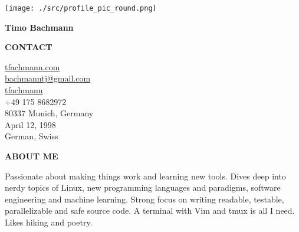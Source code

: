 \documentclass[a4paper, 10pt]{article}
\begin{document}
\thispagestyle{empty}

\begin{tcbraster}[raster columns=7]
\begin{tcolorbox}[left=4pt, right=4pt, top=4pt, height=1.0\textheight, colback=sidebar, boxrule=0.5pt, arc=8pt, frame empty, raster multicolumn=2, nobeforeafter]
    \texttt{[image: ./src/profile\_pic\_round.png]}
    \begin{center}
        {\large \textbf{Timo Bachmann}} \\
    \end{center}

    \vspace{6mm}
    \begin{center}
        {\textbf{CONTACT}} \\
    \end{center}
    \small
    \begin{spacing}{1.325}
        \hspace*{10pt} \href{https://tfachmann.com}{tfachmann.com} \\
        \hspace*{10pt} \href{mailto:bachmanntj@gmail.com}{bachmanntj@gmail.com} \\
        \hspace*{10pt} \href{https://github.com/tfachmann}{tfachmann} \\
        \hspace*{10pt} +49 175 8682972 \\
        \hspace*{10pt} 80337 Munich, Germany \\
        \hspace*{10pt} April 12, 1998 \\
        \hspace*{10pt} German, Swiss
    \end{spacing}
    \vspace{6mm}

    \begin{center}
        {\textbf{ABOUT ME}} \\
    \end{center}
    \begin{center}
        Passionate about making things work and learning new tools.
        Dives deep into nerdy topics of Linux, new programming languages and paradigms, software engineering and machine learning.
        Strong focus on writing readable, testable, parallelizable and safe source code.
        A terminal with Vim and tmux is all I need.
        Likes hiking and poetry.
    \end{center}


\end{tcolorbox}
\end{tcbraster}
\end{document}
